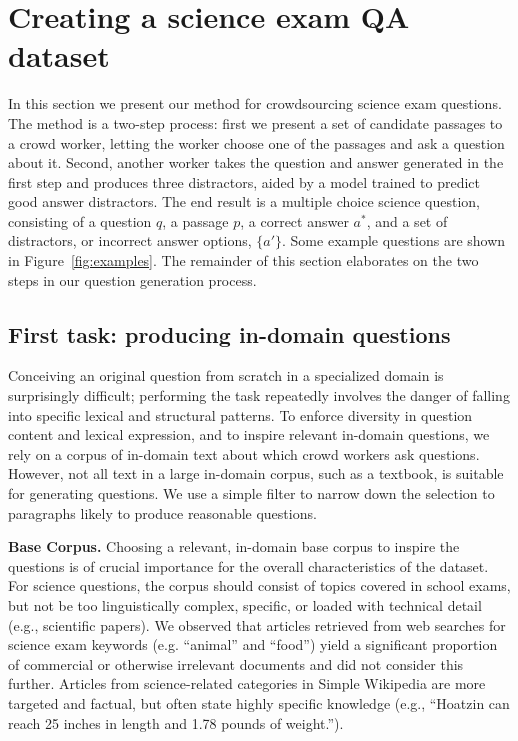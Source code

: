 \section{Creating a science exam QA dataset}
\label{sec:method}

In this section we present our method for crowdsourcing science exam questions. The method is a two-step process: first we present a set of candidate passages to a crowd worker, letting the worker choose one of the passages and ask a question about it.  Second, another worker takes the question and answer generated in the first step and produces three distractors, aided by a model trained to predict good answer distractors.  The end result is a multiple choice science question, consisting of a question $q$, a passage $p$, a correct answer $a^*$, and a set of distractors, or incorrect answer options, $\{a'\}$.  Some example questions are shown in
Figure~\ref{fig:examples}.
The remainder of this section elaborates on the two steps in our question generation process.

\subsection{First task: producing in-domain questions}

Conceiving an original question from scratch in a specialized domain is surprisingly difficult; performing the task repeatedly involves the danger of falling into specific lexical and structural patterns.  To enforce diversity in question content and lexical expression, and to inspire relevant in-domain questions, we rely on a corpus of in-domain text about which crowd workers ask questions.  However, not all text in a large in-domain corpus, such as a textbook, is suitable for generating questions. We use a simple filter to narrow down the selection to paragraphs likely to produce reasonable questions. 

\textbf{Base Corpus.} Choosing a relevant, in-domain base corpus to inspire the questions is of crucial importance for the overall characteristics of the dataset. For science questions, the corpus should consist of topics covered in school exams, but not be too linguistically complex, specific, or loaded with technical detail (e.g., scientific papers).  We observed that articles retrieved from web searches for science exam keywords (e.g. ``animal'' and ``food'') yield a significant proportion of commercial or otherwise irrelevant documents and did not consider this further.  Articles from science-related categories in Simple Wikipedia are more targeted and factual, but often state highly specific knowledge (e.g., ``Hoatzin can reach 25 inches in length and 1.78 pounds of weight.'').

